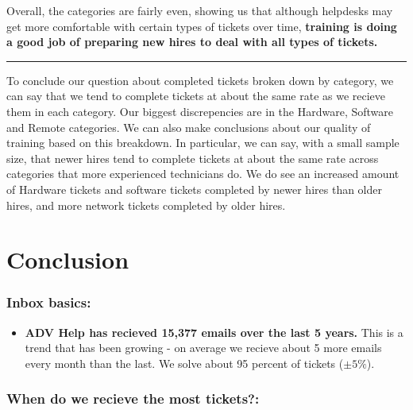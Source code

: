\documentclass[11pt]{article}
\providecommand{\tightlist}{%
      \setlength{\itemsep}{0pt}\setlength{\parskip}{0pt}}
\begin{document}
Overall, the categories are fairly even, showing us that although
helpdesks may get more comfortable with certain types of tickets over
time, \textbf{training is doing a good job of preparing new hires to
deal with all types of tickets.}

\begin{center}\rule{0.5\linewidth}{0.5pt}\end{center}

To conclude our question about completed tickets broken down by
category, we can say that we tend to complete tickets at about the same
rate as we recieve them in each category. Our biggest discrepencies are
in the Hardware, Software and Remote categories. We can also make
conclusions about our quality of training based on this breakdown. In
particular, we can say, with a small sample size, that newer hires tend
to complete tickets at about the same rate across categories that more
experienced technicians do. We do see an increased amount of Hardware
tickets and software tickets completed by newer hires than older hires,
and more network tickets completed by older hires.

    \hypertarget{conclusion}{%
\section{Conclusion}\label{conclusion}}

    \hypertarget{inbox-basics}{%
\subsubsection{Inbox basics:}\label{inbox-basics}}

\begin{itemize}
\tightlist
\item
  \textbf{ADV Help has recieved 15,377 emails over the last 5 years.}
  This is a trend that has been growing - on average we recieve about 5
  more emails every month than the last. We solve about 95 percent of
  tickets (\(\pm5 \%\)).
\end{itemize}

\hypertarget{when-do-we-recieve-the-most-tickets}{%
\subsubsection{When do we recieve the most
tickets?:}\label{when-do-we-recieve-the-most-tickets}}
\end{document}
